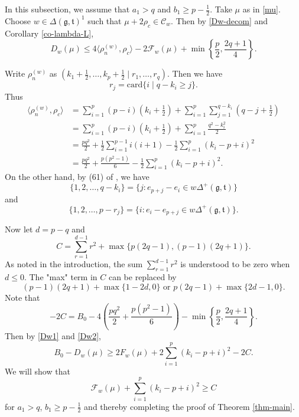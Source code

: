 \documentclass[11pt]{amsart}
\theoremstyle{plain}
\theoremstyle{definition}
\newcommand{\mfg}{\mathfrak{g}}
\newcommand{\mft}{\mathfrak{t}}
\newcommand{\C}{\mathcal{C}}
\newcommand{\F}{\mathcal{F}}
\begin{document}
In this subsection, we assume that $a_1>q$ and $b_1\ge p-\frac{1}{2}$. Take $\mu$ as in \eqref{mu}. Choose $w\in \Delta(\mfg, \mft)^1$ such that $\mu+2\rho_c\in \C_w$. Then by \eqref{Dw-decom} and Corollary \ref{co-lambda-L},
\begin{equation}\label{Dw1}
	D_w(\mu)\le 4\langle \rho_n^{(w)},\rho_c\rangle-2\F_w(\mu)+\min\left\{\frac{p}{2}, \frac{2q+1}{4}\right\}.
\end{equation}

Write $\rho_n^{(w)}$ as $(k_1+\frac{1}{2},\dots,k_p+\frac{1}{2}\mid r_1,\dots,r_q)$. Then we have
\[r_j=\mathrm{card}\{i\mid q-k_i\ge j\}.\]
Thus
\begin{equation}\label{Dw2}
\begin{split}
	\langle \rho_n^{(w)},\rho_c\rangle&=\sum_{i=1}^p(p-i)\left(k_i+\frac{1}{2}\right)+\sum_{i=1}^p\sum_{j=1}^{q-k_i}\left(q-j+\frac{1}{2}\right)\\
	&=\sum_{i=1}^p(p-i)\left(k_i+\frac{1}{2}\right)+\sum_{i=1}^p\frac{q^2-k_i^2}{2}\\
	&=\frac{pq^2}{2}+ \frac{1}{2}\sum_{i=1}^{p-1}i(i+1)-\frac{1}{2}\sum_{i=1}^p(k_i-p+i)^2\\
	&=\frac{pq^2}{2}+\frac{p(p^2-1)}{6}-\frac{1}{2}\sum_{i=1}^p(k_i-p+i)^2.
\end{split}
\end{equation}
On the other hand, by (61) of \cite{DY2}, we have
\begin{equation}\label{w1}
	\{1, 2, \dots, q-k_i\}=\{j:e_{p+j}-e_i\in w\Delta^+(\mfg,\mft)\}
\end{equation}
and
\begin{equation}\label{w2}
	\{1, 2, \dots, p-r_j\}=\{i:e_{i}-e_{p+j}\in w\Delta^+(\mfg,\mft)\}.
\end{equation}

Now let $d=p-q$ and
\[C=\sum_{r=1}^{d-1}r^2+\max\{p(2q-1),(p-1)(2q+1)\}.\]
As noted in the introduction, the sum  $\sum_{r=1}^{d-1}r^2$ is understood to be zero when $d\le 0$. 
The "max" term in $C$ can be replaced by 
$$
(p-1)(2q+1)+\max\{1-2d, 0\}
\mbox{ or }
p(2q-1)+\max\{2d-1, 0\}.
$$
Note that
\[-2C=B_0-4\left(\frac{pq^2}{2}+\frac{p(p^2-1)}{6}\right)-\min\left\{\frac{p}{2},\frac{2q+1}{4}\right\}.\]
Then by \eqref{Dw1} and \eqref{Dw2},
\[B_0-D_w(\mu)\ge 2F_w(\mu)+2\sum_{i=1}^p(k_i-p+i)^2-2C.\]
We will show that
\begin{equation}\label{eqn-C}
\F_w(\mu)+\sum_{i=1}^p(k_i-p+i)^2\ge C
\end{equation}
for $a_1>q$, $b_1\ge p-\frac{1}{2}$ and thereby completing the proof of Theorem \ref{thm-main}.
\end{document}
